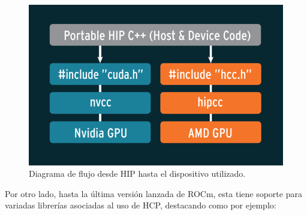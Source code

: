 \begin{figure}[h]
    \centering
    \includegraphics[height=.4\textwidth]{Figures/hipify.png}
    \caption{Diagrama de flujo desde HIP hasta el dispositivo utilizado.}
    \label{fig:2}
\end{figure}

Por otro lado, hasta la última versión lanzada de ROCm, esta tiene soporte para variadas librerías asociadas al uso de HCP, destacando como por ejemplo:

